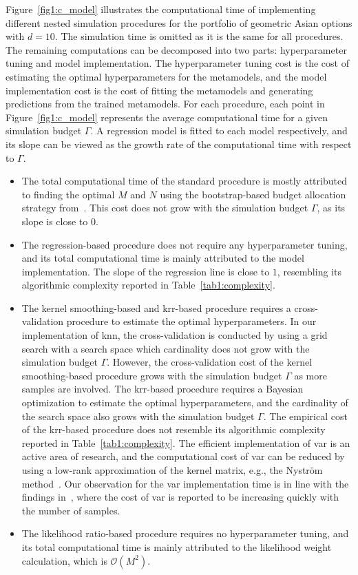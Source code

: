 Figure~\ref{fig1:c_model} illustrates the computational time of implementing different nested simulation procedures for the portfolio of geometric Asian options with $d = 10$.
The simulation time is omitted as it is the same for all procedures.
The remaining computations can be decomposed into two parts: hyperparameter tuning and model implementation.
The hyperparameter tuning cost is the cost of estimating the optimal hyperparameters for the metamodels, and the model implementation cost is the cost of fitting the metamodels and generating predictions from the trained metamodels.
For each procedure, each point in Figure~\ref{fig1:c_model} represents the average computational time for a given simulation budget $\Gamma$.
A regression model is fitted to each model respectively, and its slope can be viewed as the growth rate of the computational time with respect to $\Gamma$.
\begin{itemize}
    \item The total computational time of the standard procedure is mostly attributed to finding the optimal $M$ and $N$ using the bootstrap-based budget allocation strategy from~\cite{zhang2021bootstrap}.
    This cost does not grow with the simulation budget $\Gamma$, as its slope is close to $0$.
    \item The regression-based procedure does not require any hyperparameter tuning, and its total computational time is mainly attributed to the model implementation.
    The slope of the regression line is close to $1$, resembling its algorithmic complexity reported in Table~\ref{tab1:complexity}.
    \item The kernel smoothing-based and \gls{krr}-based procedure requires a cross-validation procedure to estimate the optimal hyperparameters. 
    In our implementation of \gls{knn}, the cross-validation is conducted by using a grid search with a search space which cardinality does not grow with the simulation budget $\Gamma$.
    However, the cross-validation cost of the kernel smoothing-based procedure grows with the simulation budget $\Gamma$ as more samples are involved.
    The \gls{krr}-based procedure requires a Bayesian optimization to estimate the optimal hyperparameters, and the cardinality of the search space also grows with the simulation budget $\Gamma$.
    The empirical cost of the \gls{krr}-based procedure does not resemble its algorithmic complexity reported in Table~\ref{tab1:complexity}.
    The efficient implementation of \gls{var} is an active area of research, and the computational cost of \gls{var} can be reduced by using a low-rank approximation of the kernel matrix, e.g., the Nystr\"om method~\citep{nystrom1930praktische}.
    Our observation for the \gls{var} implementation time is in line with the findings in~\cite{scikit-learn}, where the cost of \gls{var} is reported to be increasing quickly with the number of samples.
    \item The likelihood ratio-based procedure requires no hyperparameter tuning, and its total computational time is mainly attributed to the likelihood weight calculation, which is $\mathcal{O}(M^2)$. 
\end{itemize}
